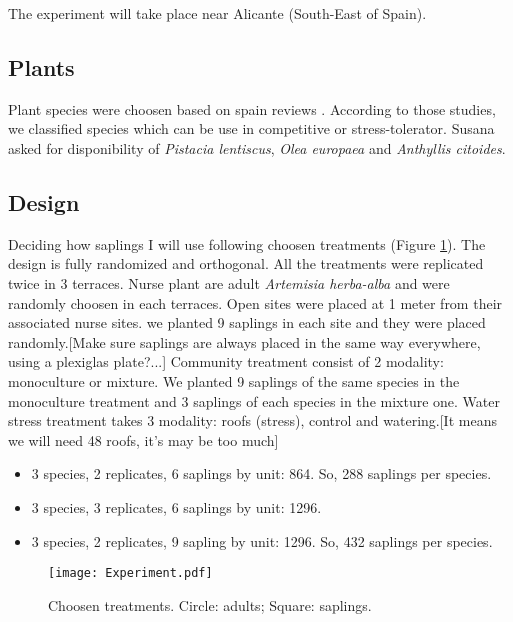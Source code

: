 \documentclass[12pt]{article} %
\begin{document}
The experiment will take place near Alicante (South-East of Spain).
\subsection{Plants}

Plant species were choosen based on spain reviews \citep{McCluney2012,Navarro2006, Jauffret2003}. According to those studies, we classified species which can be use in competitive or stress-tolerator. Susana asked for disponibility of \textit{Pistacia lentiscus}, \textit{Olea europaea} and \textit{Anthyllis citoides}.

\subsection{Design}

Deciding how saplings I will use following choosen treatments (Figure \ref{exp}). The design is fully randomized and orthogonal. All the treatments were replicated twice in 3 terraces. Nurse plant are adult \textit{Artemisia herba-alba} and were randomly choosen in each terraces. Open sites were placed at 1 meter from their associated nurse sites. we planted 9 saplings in each site and they were placed randomly.[Make sure saplings are always placed in the same way everywhere, using a plexiglas plate?...] Community treatment consist of 2 modality: monoculture or mixture. We planted 9 saplings of the same species in the monoculture treatment and 3 saplings of each species in the mixture one. Water stress treatment takes 3 modality: roofs (stress), control and watering.[It means we will need 48 roofs, it's may be too much]

\begin{itemize}
\item 3 species, 2 replicates, 6 saplings by unit: 864. So, 288 saplings per species.
\item 3 species, 3 replicates, 6 saplings by unit: 1296.
\item 3 species, 2 replicates, 9 sapling by unit: 1296. So, 432 saplings per species.
\end{itemize}


\begin{figure} %
\begin{center}
\texttt{[image: Experiment.pdf]}
\end{center}
\caption{Choosen treatments. Circle: adults; Square: saplings. \label{exp}}
\end{figure}
\end{document}
